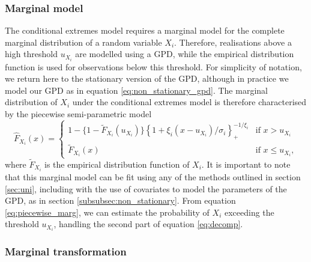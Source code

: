 \documentclass{article}
\numberwithin{equation}{section}
\begin{document}
\subsubsection{Marginal model}

The conditional extremes model requires a marginal model for the complete marginal distribution of a random variable $X_i$.
Therefore, realisations above a high threshold $u_{X_i}$ are modelled using a GPD, while the empirical distribution function is used for observations below this threshold.
For simplicity of notation, we return here to the stationary version of the GPD, although in practice we model our GPD as in equation \eqref{eq:non_stationary_gpd}.
The marginal distribution of $X_i$ under the conditional extremes model is therefore characterised by the piecewise semi-parametric model
\begin{equation} \label{eq:piecewise_marg}
  \hat{F}_{X_i}(x) = \begin{cases}
    1 - \{ 1 - \tilde{F}_{X_i}(u_{X_i})\} \left\{1 + \xi_{i}(x - u_{X_i})/\sigma_i\right\}_{+}^{-1/\xi_{i}} & \text{if } x > u_{X_i} \\
    \tilde{F}_{X_i}(x) & \text{if } x \le u_{X_i},
  \end{cases}
\end{equation}
where $\tilde{F}_{X_i}$ is the empirical distribution function of $X_i$.
It is important to note that this marginal model can be fit using any of the methods outlined in section \ref{sec:uni}, including with the use of covariates to model the parameters of the GPD, as in section \ref{subsubsec:non_stationary}.
From equation \ref{eq:piecewise_marg}, we can estimate the probability of $X_i$ exceeding the threshold $u_{X_i}$, handling the second part of equation \eqref{eq:decomp}. 

\subsubsection{Marginal transformation}
\end{document}
